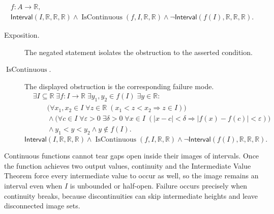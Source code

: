 \begin{remark*}
\[
\begin{aligned}
  f\colon A\to\mathbb{R},\\
\mathsf{Interval}(I,\mathbb{R},\mathbb{R},\mathbb{R})\land\operatorname{IsContinuous}(f,I,\mathbb{R},\mathbb{R})
\land\neg\mathsf{Interval}(f(I),\mathbb{R},\mathbb{R},\mathbb{R}).
\end{aligned}
\]
\end{remark*}

\begin{remark*}
\begin{description}
  \item[Exposition.]
  The negated statement isolates the obstruction to the asserted condition.

  \item[\(\operatorname{IsContinuous}.\)]
  The displayed obstruction is the corresponding failure mode.
  \[
\begin{aligned}
&\exists I\subseteq\mathbb{R}\;\exists f:I\to\mathbb{R}\;
\exists y_1,y_2\in f(I)\;\exists y\in\mathbb{R}:\\
&\qquad
\bigl(\forall x_1,x_2\in I\;\forall z\in\mathbb{R}\;(x_1<z<x_2\Rightarrow z\in I)\bigr)\\
&\qquad\land
\bigl(\forall c\in I\;\forall \varepsilon>0\;\exists \delta>0\;\forall x\in I\;
(|x-c|<\delta\Rightarrow |f(x)-f(c)|<\varepsilon)\bigr)\\
&\qquad\land
y_1<y<y_2
\land
y\notin f(I).
\end{aligned}
  \]
  \[
\mathsf{Interval}(I,\mathbb{R},\mathbb{R},\mathbb{R})\land\operatorname{IsContinuous}(f,I,\mathbb{R},\mathbb{R})
\land\neg\mathsf{Interval}(f(I),\mathbb{R},\mathbb{R},\mathbb{R}).
  \]
\end{description}
\end{remark*}



\begin{remark*}[Interpretation]
Continuous functions cannot tear gaps open inside their images of intervals. Once the function achieves two output values, continuity and the Intermediate Value Theorem force every intermediate value to occur as well, so the image remains an interval even when $I$ is unbounded or half-open. Failure occurs precisely when continuity breaks, because discontinuities can skip intermediate heights and leave disconnected image sets.
\end{remark*}

